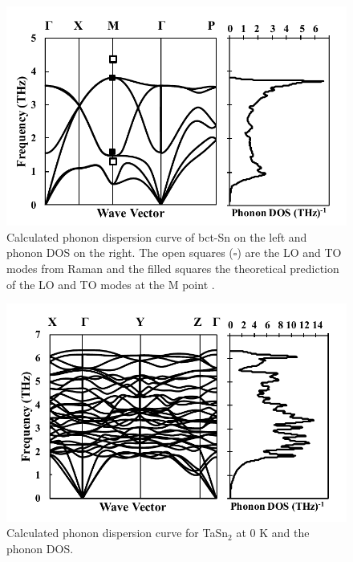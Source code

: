 \pagebreak
\begin{figure}[H]
	\centering
	\includegraphics[width=\textwidth]{Chapter-4/Figures/Snphonondos.pdf}
	\caption{Calculated phonon dispersion curve of bct-Sn on the left and phonon DOS on the right. The open squares ($\square$) are the LO and TO modes from Raman \cite{Olijnyk1992} and the filled squares the theoretical prediction of the LO and TO modes at the M point \cite{Olijnyk1992}.}
	\label{Ch4-figure:Snphonon}
\end{figure}

\pagebreak
\begin{figure}[H]
	\centering
	\includegraphics[width=\textwidth]{Chapter-4/Figures/TaSn2phonondos.pdf}
	\caption{Calculated phonon dispersion curve for TaSn$_2$ at 0 K and the phonon DOS.}
	\label{Ch4-figure:TaSn2phonon}
\end{figure}

